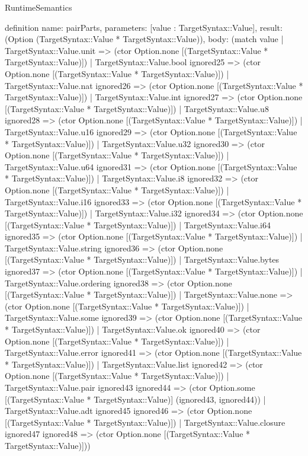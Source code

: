 \begin{lexlean}{RuntimeSemantics}
\begin{semanticmodule}
definition{
  name: pairParts,
  parameters: [value : TargetSyntax::Value],
  result: (Option (TargetSyntax::Value * TargetSyntax::Value)),
  body: (match value
    | TargetSyntax::Value.unit => (ctor Option.none [(TargetSyntax::Value * TargetSyntax::Value)])
    | TargetSyntax::Value.bool ignored25 => (ctor Option.none [(TargetSyntax::Value * TargetSyntax::Value)])
    | TargetSyntax::Value.nat ignored26 => (ctor Option.none [(TargetSyntax::Value * TargetSyntax::Value)])
    | TargetSyntax::Value.int ignored27 => (ctor Option.none [(TargetSyntax::Value * TargetSyntax::Value)])
    | TargetSyntax::Value.u8 ignored28 => (ctor Option.none [(TargetSyntax::Value * TargetSyntax::Value)])
    | TargetSyntax::Value.u16 ignored29 => (ctor Option.none [(TargetSyntax::Value * TargetSyntax::Value)])
    | TargetSyntax::Value.u32 ignored30 => (ctor Option.none [(TargetSyntax::Value * TargetSyntax::Value)])
    | TargetSyntax::Value.u64 ignored31 => (ctor Option.none [(TargetSyntax::Value * TargetSyntax::Value)])
    | TargetSyntax::Value.i8 ignored32 => (ctor Option.none [(TargetSyntax::Value * TargetSyntax::Value)])
    | TargetSyntax::Value.i16 ignored33 => (ctor Option.none [(TargetSyntax::Value * TargetSyntax::Value)])
    | TargetSyntax::Value.i32 ignored34 => (ctor Option.none [(TargetSyntax::Value * TargetSyntax::Value)])
    | TargetSyntax::Value.i64 ignored35 => (ctor Option.none [(TargetSyntax::Value * TargetSyntax::Value)])
    | TargetSyntax::Value.string ignored36 => (ctor Option.none [(TargetSyntax::Value * TargetSyntax::Value)])
    | TargetSyntax::Value.bytes ignored37 => (ctor Option.none [(TargetSyntax::Value * TargetSyntax::Value)])
    | TargetSyntax::Value.ordering ignored38 => (ctor Option.none [(TargetSyntax::Value * TargetSyntax::Value)])
    | TargetSyntax::Value.none => (ctor Option.none [(TargetSyntax::Value * TargetSyntax::Value)])
    | TargetSyntax::Value.some ignored39 => (ctor Option.none [(TargetSyntax::Value * TargetSyntax::Value)])
    | TargetSyntax::Value.ok ignored40 => (ctor Option.none [(TargetSyntax::Value * TargetSyntax::Value)])
    | TargetSyntax::Value.error ignored41 => (ctor Option.none [(TargetSyntax::Value * TargetSyntax::Value)])
    | TargetSyntax::Value.list ignored42 => (ctor Option.none [(TargetSyntax::Value * TargetSyntax::Value)])
    | TargetSyntax::Value.pair ignored43 ignored44 => (ctor Option.some [(TargetSyntax::Value * TargetSyntax::Value)] (ignored43, ignored44))
    | TargetSyntax::Value.adt ignored45 ignored46 => (ctor Option.none [(TargetSyntax::Value * TargetSyntax::Value)])
    | TargetSyntax::Value.closure ignored47 ignored48 => (ctor Option.none [(TargetSyntax::Value * TargetSyntax::Value)]))
}


\end{semanticmodule}
\end{lexlean}

